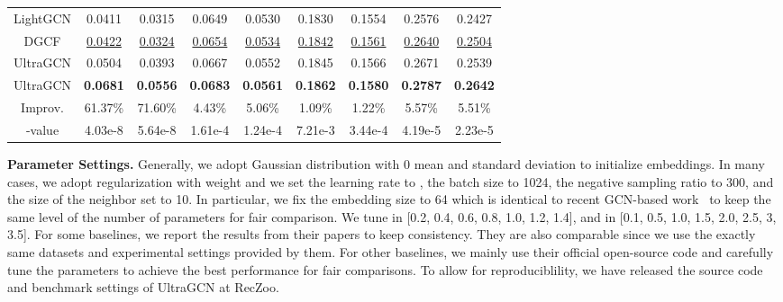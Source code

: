 \documentclass[sigconf,authorversion]{acmart}
\begin{document}
\begin{table*}[!t]
\begin{tabular}{c|cc|cc|cc|cc}
LightGCN               & 0.0411          & 0.0315          & 0.0649          & 0.0530          & 0.1830          & 0.1554          & 0.2576          & 0.2427          \\
DGCF                   & \underline{0.0422}          & \underline{0.0324}          & \underline{0.0654}         & \underline{0.0534}          & \underline{0.1842}          & \underline{0.1561}          & \underline{0.2640}          & \underline{0.2504}          \\ \hline
UltraGCN               & 0.0504 & 0.0393 & 0.0667 & 0.0552 & 0.1845 & 0.1566 & 0.2671 & 0.2539 \\
UltraGCN               & \textbf{0.0681} & \textbf{0.0556} & \textbf{0.0683} & \textbf{0.0561} & \textbf{0.1862} & \textbf{0.1580} & \textbf{0.2787} & \textbf{0.2642} \\ \hline \hline
Improv.                   &      61.37\%     & 71.60\%& 4.43\%          & 5.06\%          & 1.09\%          & 1.22\%          & 5.57\%          & 5.51\%   \\
-value                   & 4.03e-8          & 5.64e-8& 1.61e-4          & 1.24e-4          & 7.21e-3          & 3.44e-4          & 4.19e-5          & 2.23e-5   \\

\bottomrule
\end{tabular}
\label{overall_res}
\end{table*}





\textbf{Parameter Settings.} 
Generally, we adopt Gaussian distribution with 0 mean and  standard deviation to initialize embeddings. In many cases, we adopt  regularization with  weight and we set the learning rate to , the batch size to 1024, the negative sampling ratio  to 300, and the size of the neighbor set  to 10. In particular, we fix the embedding size to 64 which is identical to recent GCN-based work~\cite{NGCF,NIA-GCN,LightGCN,DGCF} to keep the same level of the number of parameters for fair comparison. We tune  in [0.2, 0.4, 0.6, 0.8, 1.0, 1.2, 1.4], and  in [0.1, 0.5, 1.0, 1.5, 2.0, 2.5, 3, 3.5]. For some baselines, we report the results from their papers to keep consistency. They are also comparable since we use the exactly same datasets and experimental settings provided by them. For other baselines, we mainly use their official open-source code and carefully tune the parameters to achieve the best performance for fair comparisons. To allow for reproduciblility, we have released the source code and benchmark settings of UltraGCN at RecZoo.
\end{document}
